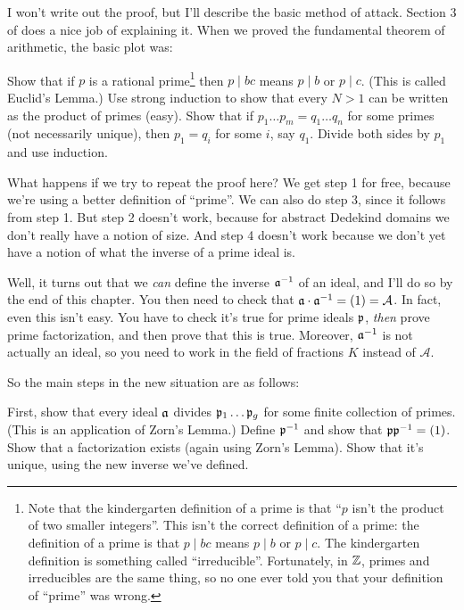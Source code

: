 I won't write out the proof, but I'll describe the basic method of attack.
Section 3 of \cite{ref:ullery} does a nice job of explaining it.
When we proved the fundamental theorem of arithmetic, the basic plot was:
\begin{enumerate}[(1)]
	\ii Show that if $p$ is a rational prime\footnote{Note
		that the kindergarten definition of a prime is
		that ``$p$ isn't the product of two smaller integers''.
		This isn't the correct definition of a prime:
		the definition of a prime is that $p \mid bc$
		means $p \mid b$ or $p \mid c$.
		The kindergarten definition is something called ``irreducible''.
		Fortunately, in $\mathbb Z$, primes and irreducibles are the same thing,
		so no one ever told you that your definition of ``prime'' was wrong.}
	then $p \mid bc$ means $p \mid b$ or $p \mid c$.  (This is called Euclid's Lemma.)
	\ii Use strong induction to show that every $N > 1$ can be written as the product of primes (easy).
	\ii Show that if $p_1 \dots p_m = q_1 \dots q_n$ for some primes (not necessarily unique),
	then $p_1 = q_i$ for some $i$, say $q_1$.
	\ii Divide both sides by $p_1$ and use induction.
\end{enumerate}
What happens if we try to repeat the proof here?
We get step 1 for free, because we're using a better definition of ``prime''.
We can also do step 3, since it follows from step 1.
But step 2 doesn't work,
because for abstract Dedekind domains
we don't really have a notion of size.
And step 4 doesn't work because we don't yet have a
notion of what the inverse of a prime ideal is.

Well, it turns out that we \emph{can} define the inverse $\mathfrak a^{-1}$ of an ideal,
and I'll do so by the end of this chapter.
You then need to check that $\mathfrak a \cdot \mathfrak a^{-1} = (1) = \mathcal A$.
In fact, even this isn't easy.
You have to check it's true for prime ideals $\mathfrak p$,
\emph{then} prove prime factorization,
and then prove that this is true.
Moreover, $\mathfrak a^{-1}$ is not actually an ideal, so you need to
work in the field of fractions $K$ instead of $\mathcal A$.

So the main steps in the new situation are as follows:
\begin{enumerate}[(1)]
	\ii First, show that every ideal $\mathfrak a$ divides $\mathfrak p_1 \dots \mathfrak p_g$
	for some finite collection of primes.
	(This is an application of Zorn's Lemma.)
	\ii Define $\mathfrak p^{-1}$ and show that $\mathfrak p \mathfrak p^{-1} = (1)$.
	\ii Show that a factorization exists (again using Zorn's Lemma).
	\ii Show that it's unique, using the new inverse we've defined.
\end{enumerate}


